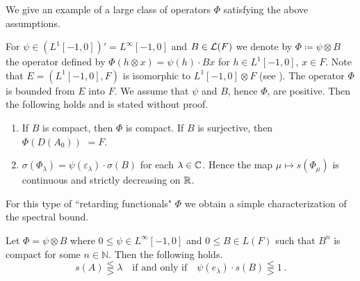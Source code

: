 \begin{example}\label{ex:c4-3.9}
We give an example of a large class of operators $\Phi$ satisfying the above assumptions.

For $\psi \in (L^{1}[-1,0])' = L^{\infty}[-1,0]$ and $B \in \mathcal{L}(F)$ we denote by $\Phi \coloneqq \psi \otimes B$ the operator defined by $\Phi(h \otimes x) = \psi(h) \cdot Bx$ for $h \in L^{1}[-1,0]$, $x \in F$.
Note that $E = (L^{1}[-1,0],F)$ is isomorphic to $L^{1}[-1,0] \otimes F$ (see \citet[Chapter III,6.5]{schaefer:1966}).
The operator $\Phi$ is bounded from $E$ into $F$.
We assume that $\psi$ and $B$, hence $\Phi$, are positive.
Then the following holds and is stated without proof.

\begin{lemma*}\label{lem:c4-3.9-kgk}
\begin{enumerate}[(1)]
\item \label{lem:c4-3.9-kgk.1}
If $B$ is compact, then $\Phi$ is compact. If $B$ is surjective, then \\
$\Phi(D(A_{0}))$ $= F$.
\item \label{lem:c4-3.9-kgk.2}
$\sigma(\Phi_{\lambda}) = \psi(\varepsilon_{\lambda}) \cdot \sigma(B)$ for each $\lambda \in \mathbb{C}$. 
Hence the map $\mu \mapsto s(\Phi_{\mu})$ is continuous and strictly decreasing on $\mathbb{R}$.
\end{enumerate}
\end{lemma*}
\end{example}

For this type of ``retarding functionals" $\Phi$ we obtain a simple characterization of the spectral bound.


\begin{corollary*}\label{cor:c4-3.9-kgk}
Let $\Phi = \psi \otimes B$ where $0 \leq \psi \in L^{\infty}[-1,0]$ and $0 \leq B \in L(F)$ such that $B^{n}$ is compact for some $n \in \mathbb{N}$.
Then the following holds.
\begin{equation}\label{eq:c4-3.10}
s(A) \lesseqqgtr \lambda \quad \text{if and only if} \quad \psi(e_{\lambda}) \cdot s(B) \lesseqqgtr 1 \,.
\end{equation}
\end{corollary*}

